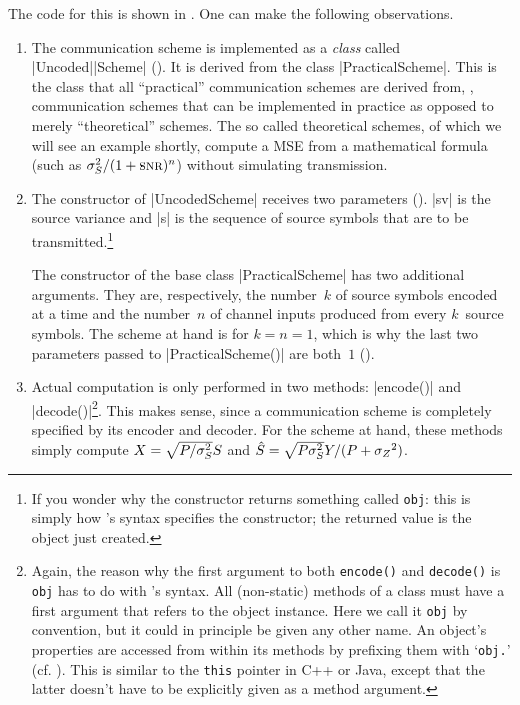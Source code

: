 The code for this is shown in .  One can make the following
observations.
\begin{enumerate}
  \item The communication scheme is implemented as a \emph{class} called
    |Uncoded|\-|Scheme| (). It is derived from the class
    |PracticalScheme|. This is the class that all ``practical'' communication
    schemes are derived from, \ie, communication schemes that can be implemented
    in practice as opposed to merely ``theoretical'' schemes. The so called
    theoretical schemes, of which we will see an example shortly, compute a MSE
    from a mathematical formula (such as $\ssq/(1+\snr)^n$) without simulating
    transmission.

  \item The constructor of |UncodedScheme| receives two parameters
    (). |sv| is the source variance and |s| is the sequence of source
    symbols that are to be transmitted.\footnote{If you wonder why the
    constructor returns something called \Verb+obj+: this is simply how
    \matlab's syntax specifies the constructor; the returned value is the object
    just created.}

    The constructor of the base class |PracticalScheme| has two additional
    arguments. They are, respectively, the number~$k$ of source symbols encoded
    at a time and the number~$n$ of channel inputs produced from every
    $k$~source symbols. The scheme at hand is for $k = n = 1$, which is why the
    last two parameters passed to |PracticalScheme()| are both~$1$
    ().

  \item Actual computation is only performed in two methods: |encode()| and
    |decode()|\footnote{Again, the reason why the first argument to both
    \Verb+encode()+ and \Verb+decode()+ is \Verb+obj+ has to do with \matlab's
    syntax. All (non-static) methods of a class must have a first argument that
    refers to the object instance. Here we call it \Verb+obj+ by convention, but
    it could in principle be given any other name. An object's properties are
    accessed from within its methods by prefixing them with `\Verb+obj.+' (cf.
    ).  This is similar to the \Verb+this+ pointer in C++ or
    Java, except that the latter doesn't have to be explicitly given as a method
    argument.}. This makes sense, since a communication scheme is completely
    specified by its encoder and decoder.  For the scheme at hand, these methods
    simply compute $X = \sqrt{P/{\sigma_S^2}} S$ and ${\hat{S}} = \sqrt{P {\sigma_S^2}} Y / (P +
    {{\sigma_Z}^2})$.
    
\end{enumerate}


